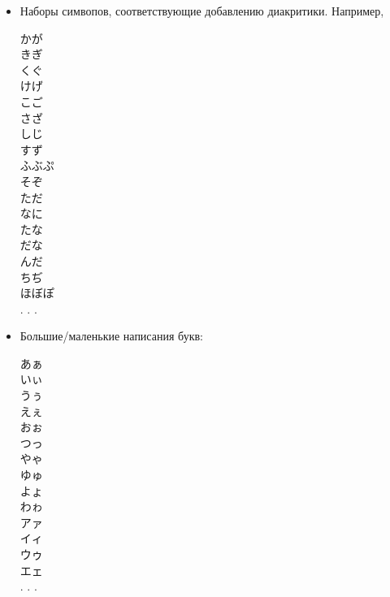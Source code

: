 \begin{itemize}
	\item[\KG] Наборы симвопов, соответствующие добавлению диакритики. Например,
	
	\begin{multicols}{3}
		\begin{CJK}{UTF8}{min}
			かが \\
			きぎ \\
			くぐ \\
			けげ \\
			こご \\
			さざ \\
			しじ \\
			すず \\
			ふぶぷ   \\
			そぞ \\
			ただ \\
			なに \\
			たな \\
			だな \\
			んだ \\
			ちぢ \\
		ほぼぽ \\
	. . .\end{CJK}
	\end{multicols}


	\item[\BS] Большие/маленькие написания букв:
	
	\begin{multicols}{3}
	\begin{CJK}{UTF8}{min}
		あぁ \\
		いぃ\\
		うぅ\\
		えぇ\\
		おぉ\\
		つっ\\
		やゃ\\
		ゆゅ\\
		よょ\\
		わゎ\\
		アァ\\
		イィ\\
		ウゥ\\
		エェ\\
		. . . \end{CJK}
\end{multicols}


\end{itemize}
